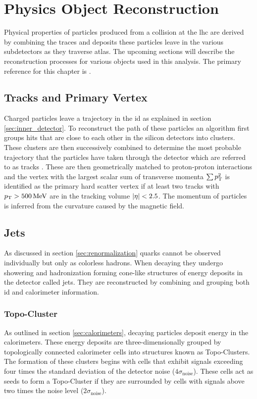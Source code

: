 \chapter{Physics Object Reconstruction}\label{ch:reco}

Physical properties of particles produced from a collision at the \ac{lhc} are derived by combining the traces and deposits these particles leave in the various subdetectors as they traverse \ac{atlas}. The upcoming sections will describe the reconstruction processes for various objects used in this analysis. The primary reference for this chapter is \citep{atlas2021optimisation}.

\section{Tracks and Primary Vertex}\label{sec:tracks}
Charged particles leave a trajectory in the \ac{id} as explained in section \ref{sec:inner_detector}. To reconstruct the path of these particles an algorithm first groups hits that are close to each other in the silicon detectors into clusters. These clusters are then successively combined to determine the most probable trajectory that the particles have taken through the detector which are referred to as tracks \citep{aaboud2017performance}. These are then geometrically matched to proton-proton interactions and the vertex with the largest scalar sum of transverse momenta $\sum p_{\text{T}}^2$ is identified as the primary hard scatter vertex if at least two tracks with $p_{\text{T}}>\qty[]{500}{MeV}$ are in the tracking volume $\left\vert\eta\right\vert<2.5$. The momentum of particles is inferred from the curvature caused by the magnetic field.

\section{Jets}\label{sec:jets}
As discussed in section \ref{sec:renormalization} quarks cannot be observed individually but only as colorless hadrons. When decaying they undergo showering and hadronization forming cone-like structures of energy deposits in the detector called jets. They are reconstructed by combining and grouping both \ac{id} and calorimeter information.

\subsection{Topo-Cluster}
As outlined in section \ref{sec:calorimeters}, decaying particles deposit energy in the calorimeters. These energy deposits are three-dimensionally grouped by topologically connected calorimeter cells into structures known as Topo-Clusters. The formation of these clusters begins with cells that exhibit signals exceeding four times the standard deviation of the detector noise ($4\sigma_\mathrm{noise}$). These cells act as seeds to form a Topo-Cluster if they are surrounded by cells with signals above two times the noise level ($2\sigma_\mathrm{noise}$).

